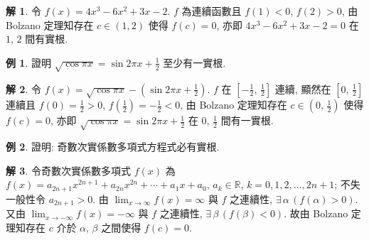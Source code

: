 \documentclass[12pt]{extarticle}
\newcommand{\ds}{\displaystyle}
\theoremstyle{definition}
\newtheorem*{ex}{例}
\newtheorem*{sol}{解}
\begin{document}
\begin{sol}
  令 $f(x) = 4x^3 - 6x^2 + 3x - 2$. $f$ 為連續函數且 $f(1) < 0$, $f(2) > 0$, 由 Bolzano 定理知存在 $c\in(1, 2)$ 使得 $f(c) = 0$, 亦即 $4x^3 - 6x^2 + 3x - 2 = 0$ 在 $1$, $2$ 間有實根. 
\end{sol}

\begin{ex}
  證明 $\sqrt{\cos\pi x} = \sin 2\pi x + \frac{1}{2}$ 至少有一實根. 
\end{ex}

\begin{sol}
  令 $f(x) = \sqrt{\cos\pi x} - (\sin 2\pi x + \frac{1}{2})$. $f$ 在 $[-\frac{1}{2},\,\frac{1}{2}]$ 連續, 顯然在 $[0,\,\frac{1}{2}]$ 連續且 $f(0) = \frac{1}{2} > 0$, $f(\frac{1}{2}) = -\frac{1}{2} < 0$, 由 Bolzano 定理知存在 $c\in(0,\,\frac{1}{2})$ 使得 $f(c) = 0$, 亦即 $\sqrt{\cos\pi x} = \sin 2\pi x + \frac{1}{2}$ 在 $0$, $\frac{1}{2}$ 間有一實根. 
\end{sol}

\begin{ex}
  證明: 奇數次實係數多項式方程式必有實根. 
\end{ex}

\begin{sol}
  令奇數次實係數多項式 $f(x)$ 為 $\ds f(x) = a_{2n + 1}x^{2n + 1} + a_{2n}x^{2n} + \cdots + a_1 x + a_0$, $a_k\in\mathbb{R}$, $k = 0, 1, 2, \ldots, 2n + 1$; 不失一般性令 $a_{2n + 1} > 0$. 由 $\ds\lim_{x\to\infty}f(x) = \infty$ 與 $f$ 之連續性, $\exists\,\alpha\,(f(\alpha) > 0)$. 又由 $\ds\lim_{x\to-\infty}f(x) = -\infty$ 與 $f$ 之連續性, $\exists\,\beta\,(f(\beta) < 0)$. 故由 Bolzano 定理知存在 $c$ 介於 $\alpha$, $\beta$ 之間使得 $f(c) = 0$.  
\end{sol}

%
\end{document}
